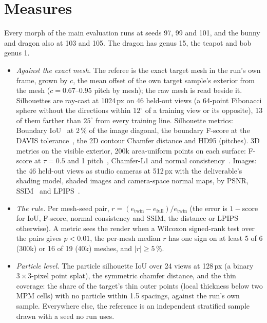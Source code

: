 \section{Measures}
\label{app:ch4_measures}
Every morph of the main evaluation runs at seeds 97, 99 and 101, and the bunny and dragon also at 103 and 105. The dragon
has genus 15, the teapot and bob genus 1.
\begin{itemize}
  \item \emph{Against the exact mesh.} The referee is the exact target mesh in the run's own frame, grown by $c$, the mean
        offset of the own target sample's exterior from the mesh ($c=0.67$--$0.95$ pitch by mesh); the raw mesh is read
        beside it. Silhouettes are ray-cast at 1024\,px on 46 held-out views (a 64-point Fibonacci sphere without the
        directions within $12^\circ$ of a training view or its opposite), 13 of them farther than $25^\circ$ from every training
        line. Silhouette metrics: Boundary IoU~\citep{cheng2021boundaryiou} at 2\,\% of the image diagonal, the boundary
        F-score at the DAVIS tolerance~\citep{perazzi2016davis}, the 2D contour Chamfer distance and HD95 (pitches). 3D metrics on the visible exterior,
        200k area-uniform points on each surface: F-score at $\tau=0.5$ and 1 pitch~\citep{knapitsch2017tanks,tatarchenko2019singleview},
        Chamfer-L1 and normal consistency~\citep{mescheder2019occupancy}. Images: the 46 held-out views as studio cameras at
        512\,px with the deliverable's shading model, shaded images and camera-space normal maps, by PSNR,
        SSIM~\citep{wang2004ssim} and LPIPS~\citep{zhang2018lpips}.
  \item \emph{The rule.} Per mesh-seed pair, $r=(e_{\mathrm{twin}}-e_{\mathrm{full}})/e_{\mathrm{twin}}$ (the error is $1-$score
        for IoU, F-score, normal consistency and SSIM, the distance or LPIPS otherwise). A metric sees the render when a
        Wilcoxon signed-rank test over the pairs gives $p<0.01$, the per-mesh median $r$ has one sign on at least 5 of 6
        (300k) or 16 of 19 (40k) meshes, and $\lvert r\rvert\geq5\,\%$.
  \item \emph{Particle level.} The particle silhouette IoU over 24 views at 128\,px (a binary $3\times3$-pixel point splat), the
        symmetric chamfer distance, and the thin coverage: the share of the target's thin outer points (local thickness below
        two MPM cells) with no particle within 1.5 spacings, against the run's own sample. Everywhere else, the reference is
        an independent stratified sample drawn with a seed no run uses.

\end{itemize}
